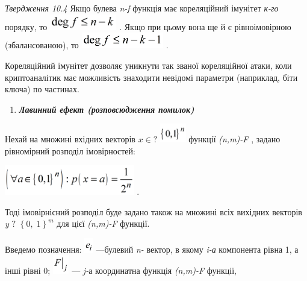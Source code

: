 \textit{Твердження 10.4}\textit{  }Якщо булева \textit{n}\textit{{}-}\textit{f} 
функція  має кореляційний імунітет \textit{к-го }порядку, то 
\includegraphics[width=1.1535in,height=0.272in]{crypt-img/crypt-img223.png} .
Якщо при цьому вона ще й  є рівноімовірною (збалансованою), то 
\includegraphics[width=1.4134in,height=0.272in]{crypt-img/crypt-img224.png} .

Кореляційний імунітет дозволяє уникнути так званої кореляційної атаки, коли
криптоаналітик має можливість знаходити невідомі параметри (наприклад, біти
ключа) по частинах.


\bigskip

\liststyleWWviiiNumxxix
\setcounter{saveenum}{\value{enumi}}
\begin{enumerate}
\setcounter{enumi}{\value{saveenum}}
\item {\bfseries\itshape
Лавинний ефект (розповсюдження помилок)}
\end{enumerate}
Нехай на множині  вхідних векторів  $x\in ?$
\includegraphics[width=0.4437in,height=0.3193in]{crypt-img/crypt-img225.png} 
функції \textit{(}\textit{n}\textit{,}\textit{m}\textit{)-}\textit{F} , задано
рівномірний розподіл імовірностей:

{\centering
 \includegraphics[width=2.2354in,height=0.5091in]{crypt-img/crypt-img226.png} .
\par}

Тоді імовірнісний розподіл буде задано також на множині всіх вихідних векторів
\textit{y} $?$ $\left\{ 0,\;1 \right\}^m$ для цієї 
\textit{(}\textit{n}\textit{,}\textit{m}\textit{)-}\textit{F}  функції.

Введемо позначення: 
\includegraphics[width=0.1528in,height=0.25in]{crypt-img/crypt-img227.png} 
---булевий \textit{n}\textit{{}-} вектор, в якому \textit{i-а }компонента рівна
1, а інші рівні 0; 
\includegraphics[width=0.278in,height=0.3193in]{crypt-img/crypt-img228.png}  ---
\textit{j-}а\textit{ }координатна функція
\textit{(}\textit{n}\textit{,}\textit{m}\textit{)-}\textit{F}  функції,

